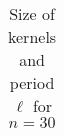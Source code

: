 \begin{table}
\begin{center}
\begin{adjustbox}{max width=\textwidth}
\begin{tabular}{|c|ccccccccccc|c|}
      \hline
    \end{tabular}
    \end{adjustbox}
  \end{center}
  \caption{Size of kernels and period $\ell$ for $n=30$}
\end{table}

